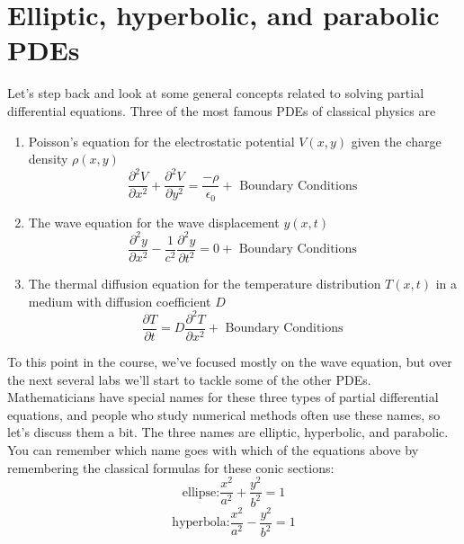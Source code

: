 \section*{Elliptic, hyperbolic, and parabolic PDEs}

Let\rq s step back and look at some general concepts related to solving partial differential equations. Three of the most famous PDEs of classical physics are

\begin{enumerate}[label=(\roman*)]
\item Poisson\rq s equation for the electrostatic potential $V (x, y)$ given the charge
density $ρ(x, y)$
\begin{equation}\label{eq:69}
\frac{\partial^{2} V}{\partial x^{2}}+\frac{\partial^{2} V}{\partial y^{2}}=\frac{-\rho}{\epsilon_{0}}+\text { Boundary Conditions }
\end{equation}
\item The wave equation for the wave displacement $y(x,t)$
\begin{equation}\label{eq:610}
\frac{\partial^{2} y}{\partial x^{2}}-\frac{1}{c^{2}} \frac{\partial^{2} y}{\partial t^{2}}=0+\text { Boundary Conditions }
\end{equation}
\item The thermal diffusion equation for the temperature distribution $T(x,t)$ in a
medium with diffusion coefficient $D$
\begin{equation}\label{eq:611}
\frac{\partial T}{\partial t}=D \frac{\partial^{2} T}{\partial x^{2}}+\text { Boundary Conditions }
\end{equation}
\end{enumerate}
To this point in the course, we\rq ve focused mostly on the wave equation, but over
the next several labs we\rq ll start to tackle some of the other PDEs. \\
Mathematicians have special names for these three types of partial differential
equations, and people who study numerical methods often use these names, so
let\rq s discuss them a bit. The three names are elliptic, hyperbolic, and parabolic.
You can remember which name goes with which of the equations above by remembering the classical formulas for these conic sections:
\begin{equation}\label{eq:612}
\text{ellipse:} \frac{x^{2}}{a^{2}}+\frac{y^{2}}{b^{2}}=1
\end{equation}
\begin{equation}\label{eq:613}
\text{hyperbola:} \frac{x^{2}}{a^{2}}-\frac{y^{2}}{b^{2}}=1
\end{equation}
